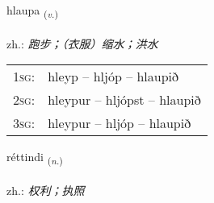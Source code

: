 \documentclass[frontgrid, backgrid]{flacards}\usepackage[]{graphicx}\usepackage[]{xcolor}
\begin{document}
\renewcommand{\flhead}{\vskip5pt \fboxsep=0pt {\small\bfseries\footnotesize Sagnorð | 动词}}
\renewcommand{\fcfoot}{\vskip5pt \fboxsep=0pt \hspace{2pt}{\small\bfseries\footnotesize 1K}}

\renewcommand{\blhead}{\vskip5pt {\small\bfseries\footnotesize Sagnorð | 动词 }}
\renewcommand{\bcfoot}{\vskip5pt \hspace{2pt}{\small\bfseries\footnotesize 1K}}


{hlaupa \small{\textsubscript{(\textit{v.})}} \\[1ex] %
\textphonetic{[l̥œiːpa]} \\
zh.: \emph{跑步；（衣服）缩水；洪水} \\  [2ex]
\renewcommand*{\arraystretch}{0.8}
\begin{tabular}{p{1cm}l}
\textsc{1sg}: & hleyp -- hljóp -- hlaupið \\ 
\textsc{2sg}: & hleypur -- hljópst -- hlaupið \\ 
\textsc{3sg}: & hleypur -- hljóp -- hlaupið \\ 
\end{tabular}
}

\renewcommand{\flhead}{\vskip5pt \fboxsep=0pt {\small\bfseries\footnotesize Nafnorð | 名词}}
\renewcommand{\fcfoot}{\vskip5pt \fboxsep=0pt \hspace{2pt}{\small\bfseries\footnotesize 1K}}

\renewcommand{\blhead}{\vskip5pt {\small\bfseries\footnotesize Nafnorð | 名词 }}
\renewcommand{\bcfoot}{\vskip5pt \hspace{2pt}{\small\bfseries\footnotesize 1K}}


{réttindi \small{\textsubscript{(\textit{n.})}} \\[1ex] %
\textphonetic{[rjɛhtɪntɪ]} \\
zh.: \emph{权利；执照} \\  [2ex]
\renewcommand*{\arraystretch}{0.8}
}
\end{document}

